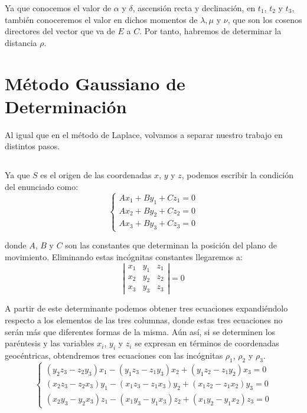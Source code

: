 \documentclass[11pt]{article}
\begin{document}
Ya que conocemos el valor de $\alpha$ y $\delta$, ascensión recta y declinación, en $t_1$, $t_2$ y $t_3$, también conoceremos el valor en dichos momentos de $\lambda, \mu$ y $\nu$, que son los cosenos directores del vector que va de $E$ a $C$. Por tanto, habremos de determinar la distancia $\rho$.\\










\iffalse



\section{Método Gaussiano de Determinación}
Al igual que en el método de Laplace, volvamos a separar nuestro trabajo en distintos pasos.\\

\subsection{}
Ya que $S$ es el origen de las coordenadas $x$, $y$ y $z$, podemos escribir la condición del enunciado como:
\[
\left\{
\begin{array}{l}
	Ax_1+By_1+Cz_1=0\\
	Ax_2+By_2+Cz_2=0\\
	Ax_3+By_3+Cz_3=0
\end{array}
\right.
\]

\noindent donde $A$, $B$ y $C$ son las constantes que determinan la posición del plano de movimiento. Eliminando estas incógnitas constantes llegaremos a:
\[
\left|
\begin{array}{ccc}
	x_1 & y_1 & z_1\\
	x_2 & y_2 & z_2\\
	x_3 & y_3 & z_3
\end{array}
\right|
=0
\]

A partir de este determinante podemos obtener tres ecuaciones expandiéndolo respecto a los elementos de las tres columnas, donde estas tres ecuaciones no serán más que diferentes formas de la misma. Aún así, si se determinen los paréntesis y las variables $x_i$, $y_i$ y $z_i$ se expresan en términos de coordenadas geocéntricas, obtendremos tres ecuaciones con las incógnitas $\rho_1$, $\rho_2$ y $\rho_3$.
\[
\left\{
\begin{array}{l}
	(y_2z_3-z_2y_3)x_1-(y_1z_3-z_1y_3)x_2+(y_1z_2-z_1y_2)x_3=0\\
	(x_2z_3-z_2x_3)y_1-(x_1z_3-z_1x_3)y_2+(x_1z_2-z_1x_2)y_3=0\\
	(x_2y_3-y_2x_3)z_1-(x_1y_3-y_1x_3)z_2+(x_1y_2-y_1x_2)z_3=0
\end{array}
\right.
\]\\
\end{document}
